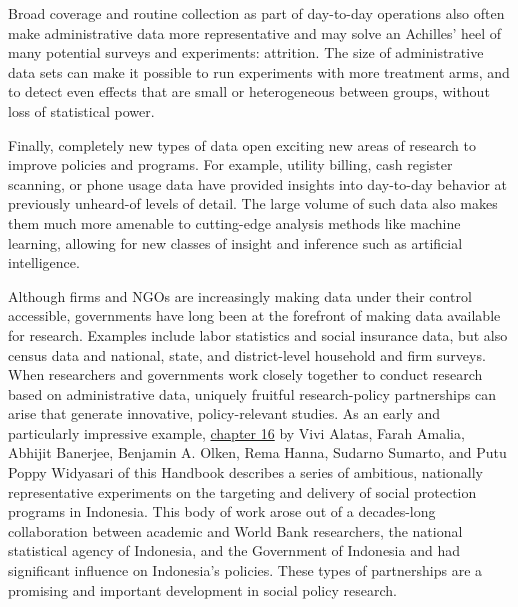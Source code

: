 Broad coverage and routine collection as part of day-to-day operations also often make administrative data more representative and may solve an Achilles' heel of many potential surveys and experiments: attrition. The size of administrative data sets can make it possible to run experiments with more treatment arms, and to detect even effects that are small or heterogeneous between groups, without loss of statistical power.

Finally, completely new types of data open exciting new areas of research to improve policies and programs. For example, utility billing, cash register scanning, or phone usage data have provided insights into day-to-day behavior at previously unheard-of levels of detail. The large volume of such data also makes them much more amenable to cutting-edge analysis methods like machine learning, allowing for new classes of insight and inference such as artificial intelligence.

Although firms and NGOs are increasingly making data under their control accessible, governments have long been at the forefront of making data available for research. Examples include labor statistics and social insurance data, but also census data and national, state, and district-level household and firm surveys. When researchers and governments work closely together to conduct research based on administrative data, uniquely fruitful research-policy partnerships can arise that generate innovative, policy-relevant studies. As an early and particularly impressive example, \protect\hyperlink{indonesia}{chapter 16} by Vivi Alatas, Farah Amalia, Abhijit Banerjee, Benjamin A. Olken, Rema Hanna, Sudarno Sumarto, and Putu Poppy Widyasari of this Handbook describes a series of ambitious, nationally representative experiments on the targeting and delivery of social protection programs in Indonesia. This body of work arose out of a decades-long collaboration between academic and World Bank researchers, the national statistical agency of Indonesia, and the Government of Indonesia and had significant influence on Indonesia's policies. These types of partnerships are a promising and important development in social policy research.

